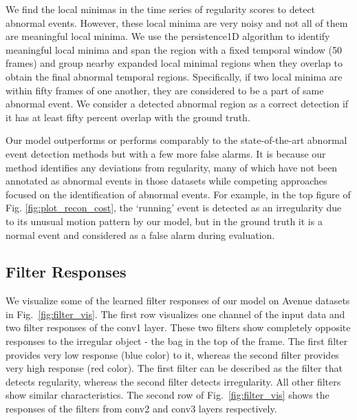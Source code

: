 \documentclass[10pt,twocolumn,letterpaper]{article}
\begin{document}
We find the local minimas in the time series of regularity scores to detect abnormal events. However, these local minima are very noisy and not all of them are meaningful local minima.
We use the persistence1D \cite{persistence1D} algorithm to identify meaningful local minima and span the region with a fixed temporal window (50 frames) and group nearby expanded local minimal regions when they overlap to obtain the final abnormal temporal regions. 
Specifically, if two local minima are within fifty frames of one another, they are considered to be a part of same abnormal event. 
We consider a detected abnormal region as a correct detection if it has at least fifty percent overlap with the ground truth.

Our model outperforms or performs comparably to the state-of-the-art abnormal event detection methods but with a few more false alarms.
It is because our method identifies any deviations from regularity, many of which have not been annotated as abnormal events in those datasets while competing approaches focused on the identification of abnormal events.
For example, in the top figure of Fig. \ref{fig:plot_recon_cost}, the `running' event is detected as an irregularity due to its unusual motion pattern by our model, but in the ground truth it is a normal event and considered as a false alarm during evaluation.

















\subsection{Filter Responses}
We visualize some of the learned filter responses of our model on Avenue datasets in Fig.~\ref{fig:filter_vis}.
The first row visualizes one channel of the input data and two filter responses of the conv1 layer. 
These two filters show completely opposite responses to the irregular object - the bag in the top of the frame. 
The first filter provides very low response (blue color) to it, whereas the second filter provides very high response (red color).
The first filter can be described as the filter that detects regularity, whereas the second filter detects irregularity.
All other filters show similar characteristics.
The second row of Fig.~\ref{fig:filter_vis} shows the responses of the filters from conv2 and conv3 layers respectively.
\end{document}
